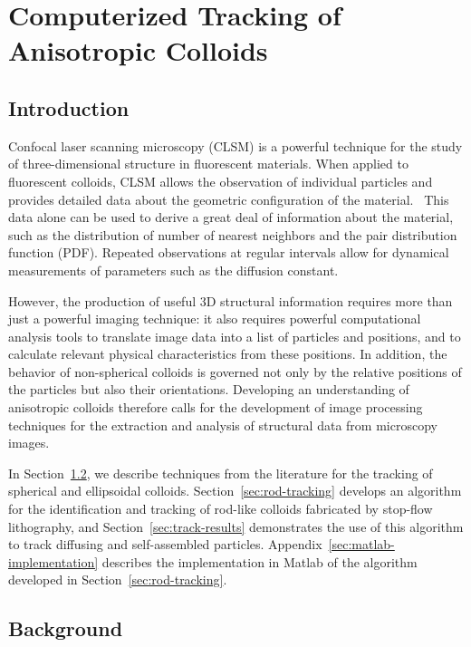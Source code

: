 \chapter{Computerized Tracking of Anisotropic Colloids}
\label{ch:comp-tracking}

\section{Introduction}

Confocal laser scanning microscopy (CLSM) is a powerful technique for the study of three-dimensional
structure in fluorescent materials. When applied to fluorescent colloids, CLSM allows the observation
of individual particles and provides detailed data about the geometric configuration of the 
material.~\cite{weitz-confocal}
This data alone can be used to derive a great deal
of information about the material, such as the distribution of number of nearest neighbors and
the pair distribution function (PDF). Repeated observations at regular intervals allow for dynamical
measurements of parameters such as the diffusion constant.~\cite{weitz-confocal,crocker-grier-spheres}

However, 
the production of useful 3D structural information requires more than just a powerful imaging technique: it also
requires powerful computational analysis tools to translate image data into a list of particles and positions, and
to calculate relevant physical characteristics from these positions.  In addition, the behavior of non-spherical colloids
is governed not only by the relative positions of the particles but also their orientations. Developing an
understanding of anisotropic colloids
therefore calls for the development of image processing techniques for the extraction and analysis of
structural data from microscopy images.

In Section~\ref{sec:track-background}, we describe techniques from the literature for the tracking of 
spherical and ellipsoidal colloids.  Section~\ref{sec:rod-tracking} develops an algorithm for the identification
and tracking of rod-like colloids fabricated by stop-flow lithography, and Section~\ref{sec:track-results}
demonstrates the use of this algorithm to track diffusing and self-assembled particles.
Appendix~\ref{sec:matlab-implementation} describes the implementation in Matlab of the algorithm developed in 
Section~\ref{sec:rod-tracking}.

\section{Background}
\label{sec:track-background}

